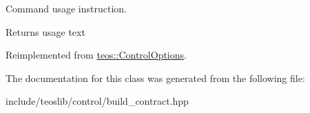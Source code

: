 Command \textquotesingle{}usage\textquotesingle{} instruction. 

\begin{DoxyReturn}{Returns}
usage text 
\end{DoxyReturn}


Reimplemented from \mbox{\hyperlink{classteos_1_1_control_options_a0aa5671f9bc750ed5280c26c543874f3}{teos\+::\+Control\+Options}}.



The documentation for this class was generated from the following file\+:\begin{DoxyCompactItemize}
\item 
include/teoslib/control/build\+\_\+contract.\+hpp\end{DoxyCompactItemize}
